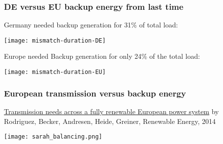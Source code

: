 \documentclass[10pt,aspectratio=169,dvipsnames]{beamer}
\begin{document}
\begin{frame}
  \frametitle{DE versus EU backup energy from last time}

  Germany needed backup generation for 31\% of total load:

  \centering
  \texttt{[image: mismatch-duration-DE]}

  \raggedright
  Europe needed Backup generation for only 24\% of the total load:

  \centering
  \texttt{[image: mismatch-duration-EU]}

\end{frame}


\begin{frame}
  \frametitle{European transmission versus backup energy}

  \href{http://www.sciencedirect.com/science/article/pii/S0960148113005351}{Transmission needs across a fully renewable European power system} by Rodriguez, Becker, Andresen, Heide, Greiner, Renewable Energy, 2014

  \centering
  \texttt{[image: sarah\_balancing.png]}


\end{frame}
\end{document}
